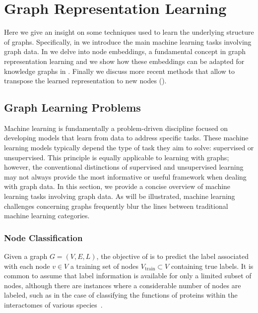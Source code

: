 \chapter{Graph Representation Learning}\label{grl}
Here we give an insight on some techniques used to learn the underlying structure of graphs. Specifically, in  we introduce the main machine learning tasks involving graph data. In  we delve into node embeddings, a fundamental concept in graph representation learning and we show how these embeddings can be adapted for knowledge graphs in . Finally we discuss more recent methods that allow to transpose the learned representation to new nodes ().

\section{Graph Learning Problems}\label{sec:graphLearningProblems}
Machine learning is fundamentally a problem-driven discipline focused on developing models that learn from data to address specific tasks. These machine learning models typically depend the type of task they aim to solve: supervised or unsupervised. This principle is equally applicable to learning with graphs; however, the conventional distinctions of supervised and unsupervised learning may not always provide the most informative or useful framework when dealing with graph data. In this section, we provide a concise overview of machine learning tasks involving graph data. As will be illustrated, machine learning challenges concerning graphs frequently blur the lines between traditional machine learning categories.

\subsection{Node Classification}
Given a graph $ G = (V,E,L) $, the objective of  is to predict the label associated with each node $ v \in V $ a training set of nodes $ V_\text{train} \subset V $ containing true labels. It is common to assume that label information is available for only a limited subset of nodes, although there are instances where a considerable number of nodes are labeled, such as in the case of classifying the functions of proteins within the interactomes of various species~\cite{Hamilton2017inductiveRepresentationLearning}.

